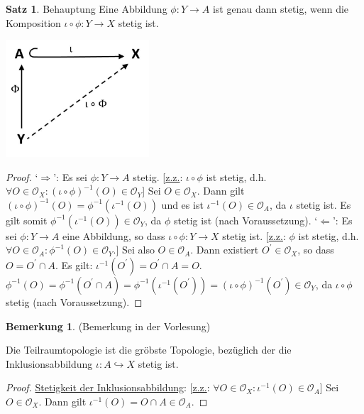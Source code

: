 \documentclass[a4paper,11pt,notitlepage]{report}
\theoremstyle{definition}
\newtheorem{theorem}{Satz}[chapter]
\newtheorem{remark}{Bemerkung}[chapter]
\newcommand{\OO}{{\ensuremath{\mathcal{O}}}}
\begin{document}
\begin{theorem}{Behauptung}
Eine Abbildung $\phi \colon Y \rightarrow A$ ist genau dann stetig, wenn die Komposition $\iota \circ \phi \colon Y \rightarrow X$ stetig ist.
\end{theorem}
\includegraphics[width=0.4\textwidth]{images/Universell_Diagramm.jpg}
\begin{proof}
`$\Rightarrow$': Es sei $\phi \colon Y \rightarrow A$ stetig. [\underline{z.z.}: $\iota \circ \phi$ ist stetig, d.h. $\forall O \in \OO_X \colon (\iota \circ \phi)^{-1}(O) \in \OO_Y$]
\newline
Sei $O \in \OO_X$. Dann gilt $(\iota \circ \phi)^{-1}(O) = \phi^{-1}\left(\iota^{-1}(O)\right)$ und es ist $\iota^{-1}(O) \in \OO_A$, da $\iota$ stetig ist.
\newline
Es gilt somit $\phi^{-1}\left(\iota^{-1}(O)\right) \in \OO_Y$, da $\phi$ stetig ist (nach Voraussetzung).
\newline
`$\Leftarrow$': Es sei $\phi \colon Y \rightarrow A$ eine Abbildung, so dass $\iota \circ \phi \colon Y \rightarrow X$ stetig ist. [\underline{z.z.}: $\phi$ ist stetig, d.h. $\forall O \in \OO_A \colon \phi^{-1}(O) \in \OO_Y$.]
\newline
Sei also $O \in \OO_A$. Dann existiert $O^\prime \in \OO_X$, so dass $O = O^\prime \cap A$.
Es gilt: $\iota^{-1}(O^\prime) = O^\prime \cap A = O$.
\newline
$\phi^{-1}(O) = \phi^{-1}(O^\prime \cap A) = \phi^{-1}\left(\iota^{-1}(O^\prime)\right) = (\iota \circ \phi)^{-1}(O^\prime) \in \OO_Y$, da $\iota \circ \phi$ stetig (nach Voraussetzung).
\end{proof}

\begin{remark}{(Bemerkung in der Vorlesung)}

Die Teilraumtopologie ist die gröbste Topologie, bezüglich der die Inklusionsabbildung $\iota \colon A \hookrightarrow X$ stetig ist.
\end{remark}

\begin{proof}
\underline{Stetigkeit der Inklusionsabbildung}: [\underline{z.z.}: $\forall O \in \OO_X \colon \iota^{-1}(O) \in \OO_A$]
\newline
Sei $O \in \OO_X$. Dann gilt $\iota^{-1}(O)=O \cap A \in \OO_A$.
\end{proof}
\end{document}
